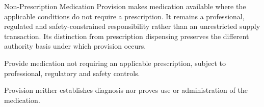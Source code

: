 Non-Prescription Medication Provision makes medication available where the applicable conditions do not require a prescription. It remains a professional, regulated and safety-constrained responsibility rather than an unrestricted supply transaction. Its distinction from prescription dispensing preserves the different authority basis under which provision occurs.



Provide medication not requiring an applicable prescription, subject to professional, regulatory and safety controls.



Provision neither establishes diagnosis nor proves use or administration of the medication.


